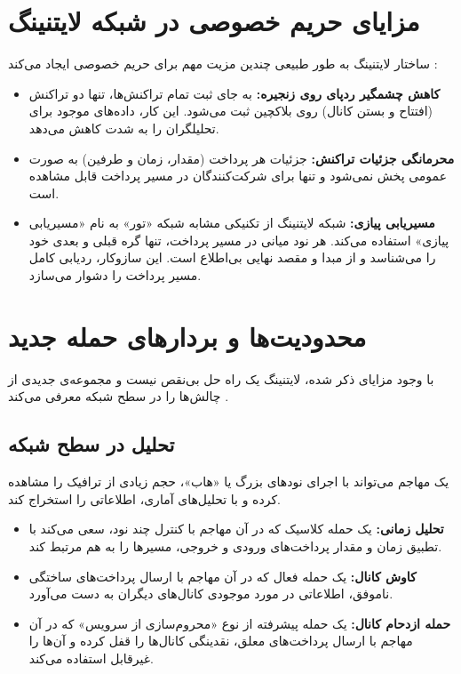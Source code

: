 \section{مزایای حریم خصوصی در شبکه لایتنینگ}

ساختار لایتنینگ به طور طبیعی چندین مزیت مهم برای حریم خصوصی ایجاد می‌کند \cite{decker_sok}:
\begin{itemize}
	\item \textbf{کاهش چشمگیر ردپای روی زنجیره:} به جای ثبت تمام تراکنش‌ها، تنها دو تراکنش (افتتاح و بستن کانال) روی بلاکچین ثبت می‌شود. این کار، داده‌های موجود برای تحلیلگران را به شدت کاهش می‌دهد.
	
	\item \textbf{محرمانگی جزئیات تراکنش:} جزئیات هر پرداخت (مقدار، زمان و طرفین) به صورت عمومی پخش نمی‌شود و تنها برای شرکت‌کنندگان در مسیر پرداخت قابل مشاهده است.
	
	\item \textbf{مسیریابی پیازی:} شبکه لایتنینگ از تکنیکی مشابه شبکه «تور» به نام «مسیریابی پیازی» استفاده می‌کند. هر نود میانی در مسیر پرداخت، تنها گره قبلی و بعدی خود را می‌شناسد و از مبدا و مقصد نهایی بی‌اطلاع است. این سازوکار، ردیابی کامل مسیر پرداخت را دشوار می‌سازد.
\end{itemize}

\section{محدودیت‌ها و بردارهای حمله جدید}

با وجود مزایای ذکر شده، لایتنینگ یک راه حل بی‌نقص نیست و مجموعه‌ی جدیدی از چالش‌ها را در سطح شبکه معرفی می‌کند \cite{decker_sok}.

\subsection{تحلیل در سطح شبکه}
یک مهاجم می‌تواند با اجرای نودهای بزرگ یا «هاب»، حجم زیادی از ترافیک را مشاهده کرده و با تحلیل‌های آماری، اطلاعاتی را استخراج کند.
\begin{itemize}
	\item \textbf{تحلیل زمانی:} یک حمله کلاسیک که در آن مهاجم با کنترل چند نود، سعی می‌کند با تطبیق زمان و مقدار پرداخت‌های ورودی و خروجی، مسیرها را به هم مرتبط کند.
	\item \textbf{کاوش کانال:} یک حمله فعال که در آن مهاجم با ارسال پرداخت‌های ساختگی ناموفق، اطلاعاتی در مورد موجودی کانال‌های دیگران به دست می‌آورد.
	\item \textbf{حمله ازدحام کانال:} یک حمله پیشرفته از نوع «محروم‌سازی از سرویس» که در آن مهاجم با ارسال پرداخت‌های معلق، نقدینگی کانال‌ها را قفل کرده و آن‌ها را غیرقابل استفاده می‌کند.
\end{itemize}

